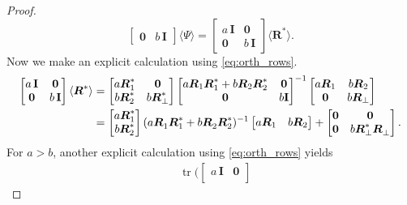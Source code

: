 \documentclass[11pt]{article}
\DeclareMathOperator{\tr}{tr}
\newcommand{\mat}[1]{\boldsymbol{#1}}
\newcommand{\Id}{\mathbf{I}}
\theoremstyle{definition}
\numberwithin{equation}{section}
\begin{document}
\begin{proof}
\begin{equation*}
\begin{bmatrix}
        \mat{0} & b\,\Id
        \end{bmatrix} \langle \mat{\varPsi} \rangle
        = \begin{bmatrix} a\,\Id & \mat{0} \\
        \mat{0} & b\,\Id
        \end{bmatrix} \langle \mat{R}^* \rangle.
    \end{equation*}
    Now we make an explicit calculation using \cref{eq:orth_rows}.
    \begin{align*}
         \begin{bmatrix} a\,\Id & \mat{0} \\
        \mat{0} & b\,\Id
        \end{bmatrix} \langle \mat{R}^* \rangle
        &= \begin{bmatrix}
        a \mat{R}^*_1 & \mat{0} \\
        b \mat{R}^*_2 & b \mat{R}^*_{\perp}
        \end{bmatrix}
        \begin{bmatrix}
            a \mat{R}_1 \mat{R}_1^* + b \mat{R}_2 \mat{R}_2^* & \mat{0} \\
            \mat{0} & b \Id
        \end{bmatrix}^{-1}
        \begin{bmatrix}
        a \mat{R}_1 & b \mat{R}_2
        \\ \mat{0} & b \mat{R}_{\perp}
        \end{bmatrix} \\
        &= \begin{bmatrix} a \mat{R}_1^* \\
        b \mat{R}_2^* \end{bmatrix}
        (a \mat{R}_1^{\vphantom{*}} \mat{R}_1^* + b \mat{R}_2^{\vphantom{*}} \mat{R}^*_2)^{-1}
        \begin{bmatrix} a \mat{R}_1 &
        b \mat{R}_2 \end{bmatrix}
        + \begin{bmatrix} \mat{0} & \mat{0} \\
        \mat{0} & b \mat{R}_{\perp}^* \mat{R}_{\perp}^{\vphantom{*}}
        \end{bmatrix}.
    \end{align*}
    For $a > b$, another explicit calculation using \cref{eq:orth_rows} yields
    \begin{align*}
        & \tr\Biggl(\begin{bmatrix} a\,\Id & \mat{0} \\

\end{bmatrix}
\end{align*}
\end{proof}
\end{document}
